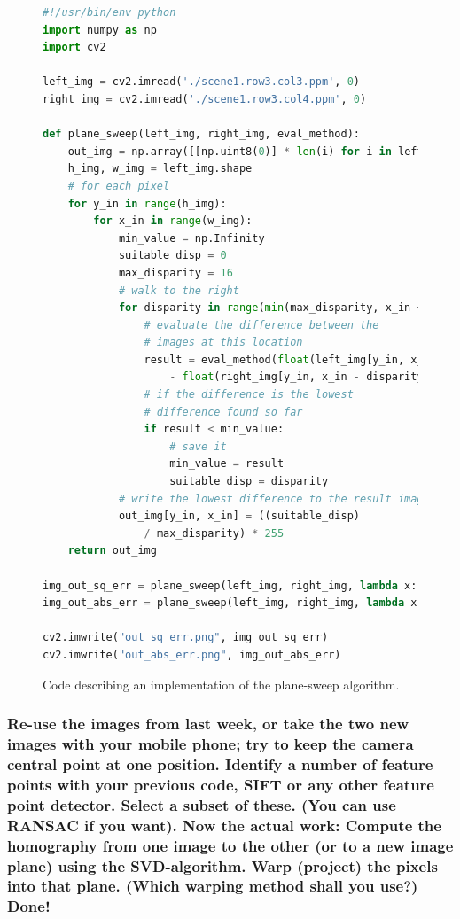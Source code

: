 \documentclass[a4paper, titlepage,12pt]{article}
\begin{document}
	\begin{figure}[H]
		\begin{center}
			\begin{lstlisting}[language=Python]
#!/usr/bin/env python
import numpy as np
import cv2

left_img = cv2.imread('./scene1.row3.col3.ppm', 0)
right_img = cv2.imread('./scene1.row3.col4.ppm', 0)

def plane_sweep(left_img, right_img, eval_method):
    out_img = np.array([[np.uint8(0)] * len(i) for i in left_img])
    h_img, w_img = left_img.shape
	# for each pixel
    for y_in in range(h_img):
        for x_in in range(w_img):
            min_value = np.Infinity
            suitable_disp = 0
            max_disparity = 16
			# walk to the right 
            for disparity in range(min(max_disparity, x_in + 1)):
				# evaluate the difference between the 
				# images at this location
                result = eval_method(float(left_img[y_in, x_in]) 
					- float(right_img[y_in, x_in - disparity]))
				# if the difference is the lowest
				# difference found so far
                if result < min_value:
					# save it
                    min_value = result
                    suitable_disp = disparity
			# write the lowest difference to the result image
            out_img[y_in, x_in] = ((suitable_disp) 
				/ max_disparity) * 255
    return out_img

img_out_sq_err = plane_sweep(left_img, right_img, lambda x: x ** 2)
img_out_abs_err = plane_sweep(left_img, right_img, lambda x: abs(x))

cv2.imwrite("out_sq_err.png", img_out_sq_err)
cv2.imwrite("out_abs_err.png", img_out_abs_err)
			\end{lstlisting}
			\caption{Code describing an implementation of the plane-sweep algorithm.}
		\end{center}
	\end{figure}

	\subsubsection*{Re-use the images from last week, or take the two new images with your mobile phone; try to keep the camera central point at one position. Identify a number of feature points with your previous code, SIFT or any other feature point detector. Select a subset of these. (You can use RANSAC if you want). Now the actual work: Compute the homography from one image to the other (or to a new image plane) using the SVD-algorithm. Warp (project) the pixels into that plane. (Which warping method shall you use?) Done!}
\end{document}
